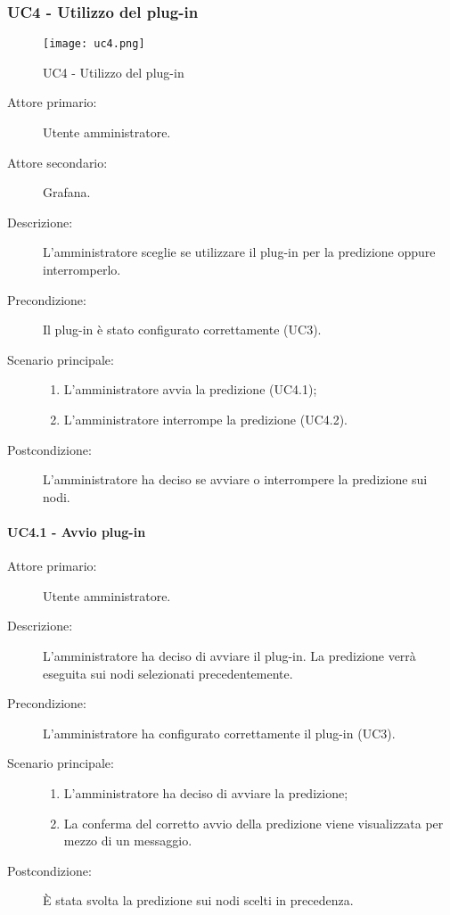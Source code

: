 \subsubsection{UC4 - Utilizzo del plug-in}
\label{sssec:uc4}

\begin{figure}[h!]
  \begin{center}
    \texttt{[image: uc4.png]}\\
    \caption{UC4 - Utilizzo del plug-in}%
    \label{fig:uc4}
  \end{center}
  \end{figure}

\begin{description}
  \item[Attore primario:] Utente amministratore.
  \item[Attore secondario:] Grafana.
  \item[Descrizione:] L'amministratore sceglie se utilizzare il plug-in per la predizione oppure interromperlo.
  \item[Precondizione:] Il plug-in è stato configurato correttamente (UC3).
  \item[Scenario principale:]
  \begin{enumerate}
    \item L'amministratore avvia la predizione (UC4.1);
    \item L'amministratore interrompe la predizione (UC4.2).
  \end{enumerate}
  \item[Postcondizione:] L'amministratore ha deciso se avviare o interrompere la predizione sui nodi.
\end{description}

\paragraph{UC4.1 - Avvio plug-in}
\label{sssec:uc4.1}
\begin{description}
  \item[Attore primario:] Utente amministratore.
  \item[Descrizione:] L'amministratore ha deciso di avviare il plug-in. La predizione verrà eseguita sui nodi selezionati precedentemente.
  \item[Precondizione:] L'amministratore ha configurato correttamente il plug-in (UC3).
  \item[Scenario principale:]
  \begin{enumerate}
    \item L'amministratore ha deciso di avviare la predizione;
    \item La conferma del corretto avvio della predizione viene visualizzata per mezzo di un messaggio.
  \end{enumerate}
  \item[Postcondizione:] È stata svolta la predizione sui nodi scelti in precedenza.
\end{description}

